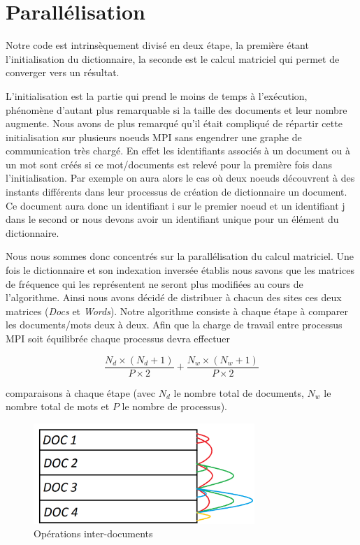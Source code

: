 \section{Parallélisation}

Notre code est intrinsèquement divisé en deux étape,
la première étant l'initialisation du dictionnaire,
la seconde est le calcul matriciel qui permet de
converger vers un résultat.

L'initialisation est la partie qui prend le moins
de temps à l'exécution,
phénomène d'autant plus remarquable si la taille des
documents et leur nombre augmente.
Nous avons de plus remarqué qu'il était compliqué de répartir
cette initialisation sur plusieurs noeuds MPI sans
engendrer une graphe de communication très chargé.
En effet les identifiants associés à un document
ou à un mot sont créés si ce mot/documents est relevé
pour la première fois dans l'initialisation.
Par exemple on aura alors le cas où deux noeuds
découvrent à des instants différents dans leur processus
de création de dictionnaire un document.
Ce document aura donc un identifiant i sur
le premier noeud et un identifiant j dans le second
or nous devons avoir un identifiant unique pour
un élément du dictionnaire.

Nous nous sommes donc concentrés sur la parallélisation
du calcul matriciel.
Une fois le dictionnaire et son indexation inversée
établis nous savons que les matrices de fréquence qui les
représentent ne seront plus modifiées au cours de l'algorithme.
Ainsi nous avons décidé de distribuer à chacun des sites
ces deux matrices ({\it Docs} et {\it Words}).
Notre algorithme consiste à chaque étape à comparer
les documents/mots deux à deux.
Afin que la charge de travail entre processus MPI soit
équilibrée chaque processus devra effectuer

\[ \frac{N_d \times (N_d+1)}{P \times 2}
 + \frac{N_w \times (N_w+1)}{P \times 2} \]

comparaisons à chaque étape
(avec $N_d$ le nombre total de documents,
$N_w$ le nombre total de mots et
$P$ le nombre de processus).

\begin{figure}[h]
\begin{center}
\includegraphics[height=1.5in]{cr/1}
\caption{Opérations inter-documents}
\end{center}
\end{figure}

